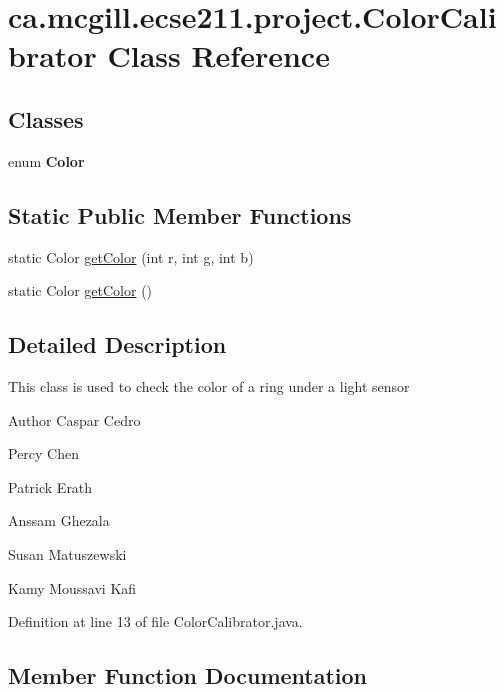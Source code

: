 \hypertarget{classca_1_1mcgill_1_1ecse211_1_1project_1_1_color_calibrator}{}\section{ca.\+mcgill.\+ecse211.\+project.\+Color\+Calibrator Class Reference}
\label{classca_1_1mcgill_1_1ecse211_1_1project_1_1_color_calibrator}
\subsection*{Classes}
\begin{DoxyCompactItemize}
\item 
enum {\bfseries Color}
\end{DoxyCompactItemize}
\subsection*{Static Public Member Functions}
\begin{DoxyCompactItemize}
\item 
static Color \hyperlink{classca_1_1mcgill_1_1ecse211_1_1project_1_1_color_calibrator_a92e653a6a9f7a31cb7b6f9bc2e732133}{get\+Color} (int r, int g, int b)
\item 
static Color \hyperlink{classca_1_1mcgill_1_1ecse211_1_1project_1_1_color_calibrator_a1acf05f9523b2c0f329d4a7cbf1b9c47}{get\+Color} ()
\end{DoxyCompactItemize}


\subsection{Detailed Description}
This class is used to check the color of a ring under a light sensor

\begin{DoxyAuthor}{Author}
Caspar Cedro 

Percy Chen 

Patrick Erath 

Anssam Ghezala 

Susan Matuszewski 

Kamy Moussavi Kafi 
\end{DoxyAuthor}


Definition at line 13 of file Color\+Calibrator.\+java.



\subsection{Member Function Documentation}
\mbox{\label{classca_1_1mcgill_1_1ecse211_1_1project_1_1_color_calibrator_a92e653a6a9f7a31cb7b6f9bc2e732133}} 
